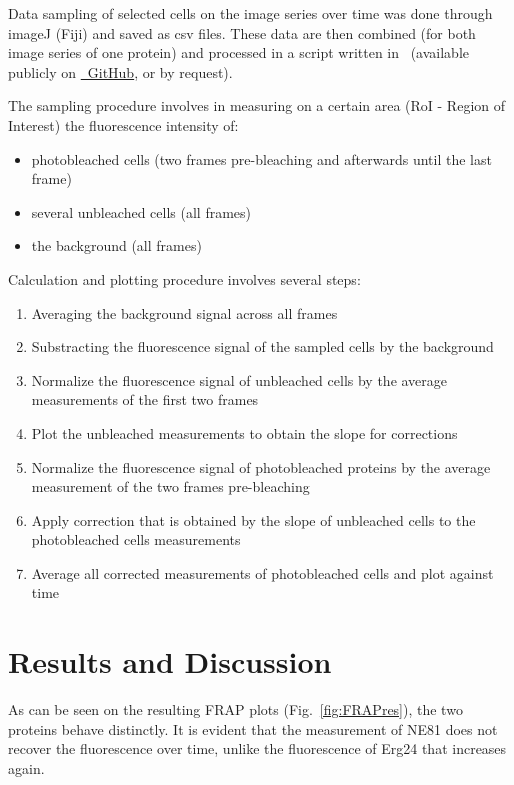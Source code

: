 Data sampling of selected cells on the image series over time was done through imageJ (Fiji) and saved as csv files. 
These data are then combined (for both image series of one protein) and processed in a script written in \faRProject~(available publicly on \href{https://github.com/howset/LightMicro}{\faGithub~GitHub}, or by request).

The sampling procedure involves in measuring on a certain area (RoI - Region of Interest) the fluorescence intensity of: 
\begin{itemize}
\item photobleached cells (two frames pre-bleaching and afterwards until the last frame)
\item several unbleached cells (all frames)
\item the background (all frames)
\end{itemize}

Calculation and plotting procedure involves several steps:
\begin{enumerate}
\item Averaging the background signal across all frames
\item Substracting the fluorescence signal of the sampled cells by the background
\item Normalize the fluorescence signal of unbleached cells by the average measurements of the first two frames
\item Plot the unbleached measurements to obtain the slope for corrections
\item Normalize the fluorescence signal of photobleached proteins by the average measurement of the two frames pre-bleaching
\item Apply correction that is obtained by the slope of unbleached cells to the photobleached cells measurements
\item Average all corrected measurements of photobleached cells and plot against time
\end{enumerate}
\section{Results and Discussion}

As can be seen on the resulting FRAP plots (Fig.~\ref{fig:FRAPres}), the two proteins behave distinctly. 
It is evident that the measurement of NE81 does not recover the fluorescence over time, unlike the fluorescence of Erg24 that increases again. 

